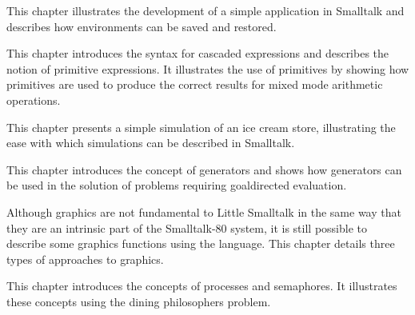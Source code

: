 This chapter illustrates the development of a simple application in
Smalltalk and describes how environments can be saved and restored.


\secup

\secdown

This chapter introduces the syntax for cascaded expressions and describes the notion of primitive expressions. It illustrates the use of
primitives by showing how primitives are used to produce the correct
results for mixed mode arithmetic operations.


\secup

\secdown

This chapter presents a simple simulation of an ice cream store, illustrating the ease with which simulations can be described in Smalltalk.


\secup

\secdown

This chapter introduces the concept of generators and shows how
generators can be used in the solution of problems requiring goaldirected evaluation.


\secup

\secdown

Although graphics are not fundamental to Little Smalltalk in the same
way that they are an intrinsic part of the Smalltalk-80 system, it is still
possible to describe some graphics functions using the language. This
chapter details three types of approaches to graphics.


\secup

\secdown

This chapter introduces the concepts of processes and semaphores. It
illustrates these concepts using the dining philosophers problem.


